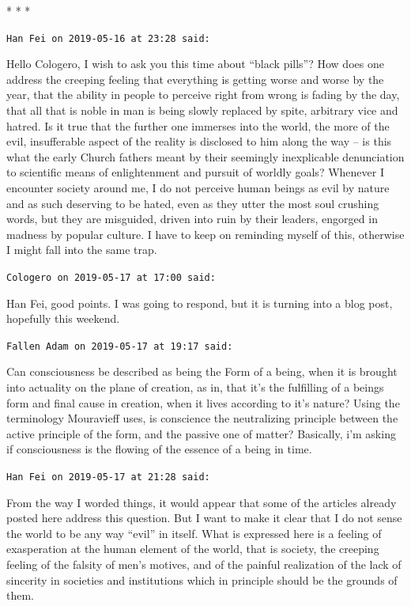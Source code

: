 
\begin{center}* * *\end{center}

\begin{footnotesize}
\begin{sffamily}
\texttt{Han Fei on 2019-05-16 at 23:28 said:}

Hello Cologero, I wish to ask you this time about ``black pills''? How does one address the creeping feeling that everything is getting worse and worse by the year, that the ability in people to perceive right from wrong is fading by the day, that all that is noble in man is being slowly replaced by spite, arbitrary vice and hatred. Is it true that the further one immerses into the world, the more of the evil, insufferable aspect of the reality is disclosed to him along the way -- is this what the early Church fathers meant by their seemingly inexplicable denunciation to scientific means of enlightenment and pursuit of worldly goals? Whenever I encounter society around me, I do not perceive human beings as evil by nature and as such deserving to be hated, even as they utter the most soul crushing words, but they are misguided, driven into ruin by their leaders, engorged in madness by popular culture. I have to keep on reminding myself of this, otherwise I might fall into the same trap.

\hfill

\texttt{Cologero on 2019-05-17 at 17:00 said:}

Han Fei, good points. I was going to respond, but it is turning into a blog post, hopefully this weekend.

\hfill

\texttt{Fallen Adam on 2019-05-17 at 19:17 said:}

Can consciousness be described as being the Form of a being, when it is brought into actuality on the plane of creation, as in, that it's the fulfilling of a beings form and final cause in creation, when it lives according to it's nature? Using the terminology Mouravieff uses, is conscience the neutralizing principle between the active principle of the form, and the passive one of matter? Basically, i'm asking if consciousness is the flowing of the essence of a being in time.

\hfill

\texttt{Han Fei on 2019-05-17 at 21:28 said:}

From the way I worded things, it would appear that some of the articles already posted here address this question. But I want to make it clear that I do not sense the world to be any way ``evil'' in itself. What is expressed here is a feeling of exasperation at the human element of the world, that is society, the creeping feeling of the falsity of men's motives, and of the painful realization of the lack of sincerity in societies and institutions which in principle should be the grounds of them.


\end{sffamily}
\end{footnotesize}
